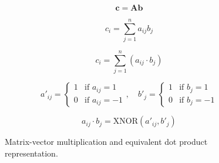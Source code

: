 \documentclass[conference]{IEEEtran}
\begin{document}
\begin{figure}[h]
    \centering
    \begin{equation}
    \mathbf{c} = \mathbf{A} \mathbf{b}
    \label{eq:matrix_vector_multiplication}
    \end{equation}

    \begin{equation}
    c_i = \sum_{j=1}^n a_{ij} b_j
    \label{eq:dot_product}
    \end{equation}

    \begin{equation}
    c_i = \sum_{j=1}^n (a_{ij} \cdot b_j)
    \label{eq:component_wise_dot}
    \end{equation}

    \begin{equation}
    a'_{ij} = \begin{cases}
    1 & \text{if } a_{ij} = 1 \\
    0 & \text{if } a_{ij} = -1
    \end{cases}, \quad
    b'_j = \begin{cases}
    1 & \text{if } b_j = 1 \\
    0 & \text{if } b_j = -1
    \end{cases}
    \label{eq:mapping}
    \end{equation}

    \begin{equation}
    a_{ij} \cdot b_j = \text{XNOR}(a'_{ij}, b'_j)
    \label{eq:xnor}
    \end{equation}

    \caption{Matrix-vector multiplication and equivalent dot product representation.}
    \label{fig:matrix_vector_multiplication}
\end{figure}
\end{document}

